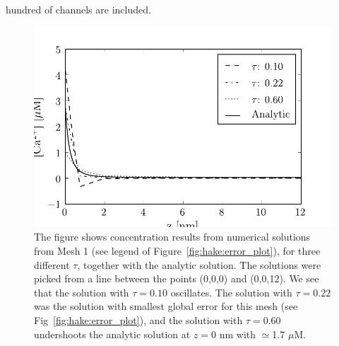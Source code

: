 hundred of channels are included.
\begin{figure}
  \label{fig:hake:traces_mesh_1}
  \includegraphics[width=\linewidth]{chapters/hake/pdf/traces_mesh_1}
  \caption[Concentration traces 1]{The figure shows concentration
    results from numerical solutions from Mesh 1 (see legend of
    Figure~\ref{fig:hake:error_plot}), for three different $\tau$,
    together with the analytic solution. The solutions were picked
    from a line between the points (0,0,0) and (0,0,12). We see that
    the solution with $\tau=0.10$ oscillates. The solution with
    $\tau=0.22$ was the solution with smallest global error for this
    mesh (see Fig~\ref{fig:hake:error_plot}), and the solution with
    $\tau=0.60$ undershoots the analytic solution at $z=0$ nm with
    $\simeq$1.7 $\mu$M.}
\end{figure}

